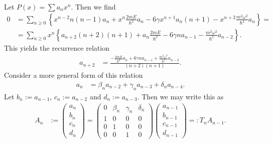 \documentclass[english, parskip=full]{scrartcl}
\newcommand{\kla}{}
\newcommand{\klammer}{}
\begin{document}
Let $P(x) = \sum a_nx^n$.
Then we find
\begin{align}
0 &= \sum_{n\ge 0} \klammer\left\{ x^{n-2} n(n-1)a_n + x^n \frac{2mE}{\hbar^2}a_n - 6\gamma x^{n+1}a_n (n+1) - x^{n+2} \frac{m^2\omega^2}{\hbar^2} a_n \right\} = \\
&= \sum_{n\ge 0} x^n \klammer\left\{ a_{n+2} (n+2)(n+1) + a_n \frac{2mE}{\hbar^2} -6\gamma n a_{n-1} - \frac{m^2\omega^2}{\hbar^2}a_{n-2} \right\}.
\end{align}
This yields the recurrence relation
\begin{align}
a_{n+2} &= \frac{-\frac{2mE}{\hbar^2} a_n + 6\gamma n a_{n-1} + \frac{m^2\omega^2}{\hbar^2} a_{n-2}}{(n+2)(n+1)}.
\end{align}
Consider a more general form of this relation
\begin{align}
a_{n} &= \beta_na_{n-2} + \gamma_na_{n-3} + \delta_na_{n-4}.
\end{align}
Let $b_n := a_{n-1}$, $c_n := a_{n-2}$ and $d_n := a_{n-3}$.
Then we may write this as
\begin{align}
A_n &:= \begin{pmatrix}
a_n \\ b_n \\ c_n \\ d_n
\end{pmatrix} = \begin{pmatrix}
0 & \beta_n & \gamma_n & \delta_n \\
1 & 0 & 0 & 0 \\
0 & 1 & 0 & 0 \\
0 & 0 & 1 & 0
\end{pmatrix} \begin{pmatrix}
a_{n-1} \\ b_{n-1} \\ c_{n-1} \\ d_{n-1}
\end{pmatrix} =: T_nA_{n-1}.
\end{align}



\end{document}
